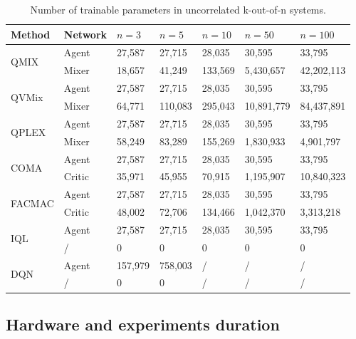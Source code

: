 \begin{table}
    \caption{Number of trainable parameters in uncorrelated k-out-of-n systems.}
    \centering
    \begin{tabular}{lllllll}
    \toprule
    Method & Network & $n=3$ & $n=5$ & $n=10$ & $n=50$ & $n=100$ \\
    \midrule
    \multirow{2}{*}{QMIX} & Agent & 27,587 & 27,715 & 28,035 & 30,595 & 33,795 \\
 & Mixer & 18,657 & 41,249 & 133,569 & 5,430,657 & 42,202,113 \\
\multirow{2}{*}{QVMix} & Agent & 27,587 & 27,715 & 28,035 & 30,595 & 33,795 \\
 & Mixer & 64,771 & 110,083 & 295,043 & 10,891,779 & 84,437,891 \\
\multirow{2}{*}{QPLEX} & Agent & 27,587 & 27,715 & 28,035 & 30,595 & 33,795 \\
 & Mixer & 58,249 & 83,289 & 155,269 & 1,830,933 & 4,901,797 \\
\multirow{2}{*}{COMA} & Agent & 27,587 & 27,715 & 28,035 & 30,595 & 33,795 \\
 & Critic & 35,971 & 45,955 & 70,915 & 1,195,907 & 10,840,323 \\
\multirow{2}{*}{FACMAC} & Agent & 27,587 & 27,715 & 28,035 & 30,595 & 33,795 \\
 & Critic & 48,002 & 72,706 & 134,466 & 1,042,370 & 3,313,218 \\
\multirow{2}{*}{IQL} & Agent & 27,587 & 27,715 & 28,035 & 30,595 & 33,795 \\
 & / & 0 & 0 & 0 & 0 & 0 \\
\multirow{2}{*}{DQN} & Agent & 157,979 & 758,003 & / & / & / \\
 & / & 0 & 0 & / & / & / \\
    \bottomrule
    \end{tabular}
    \label{tab:n_param_train}
\end{table}



\subsection{Hardware and experiments duration}
\label{app:duration}

